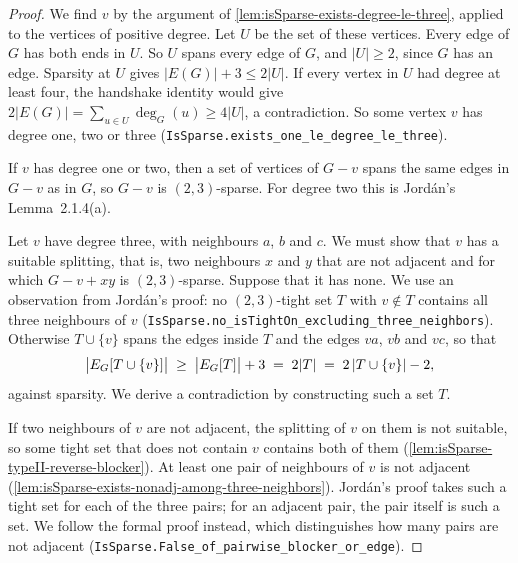 \begin{proof}
  \leanok
  We find $v$ by the argument of
  \cref{lem:isSparse-exists-degree-le-three}, applied to the vertices
  of positive degree. Let $U$ be the set of these vertices. Every edge
  of $G$ has both ends in $U$. So $U$ spans every edge of $G$, and
  $|U| \ge 2$, since $G$ has an edge. Sparsity at $U$ gives
  $|E(G)| + 3 \le 2|U|$. If every vertex in $U$ had degree at least
  four, the handshake identity would give
  $2|E(G)| = \sum_{u \in U} \deg_G(u) \ge 4|U|$, a contradiction. So
  some vertex $v$ has degree one, two or three
  (\texttt{IsSparse.\allowbreak{}exists\_\allowbreak{}one\_\allowbreak{}le\_\allowbreak{}degree\_\allowbreak{}le\_\allowbreak{}three}).

  If $v$ has degree one or two, then a set of vertices of $G - v$
  spans the same edges in $G - v$ as in $G$, so $G - v$ is
  $(2,3)$-sparse. For degree two this is Jord\'an's Lemma~2.1.4(a).

  Let $v$ have degree three, with neighbours $a$, $b$ and $c$. We must
  show that $v$ has a suitable splitting, that is, two neighbours $x$
  and $y$ that are not adjacent and for which $G - v + xy$ is
  $(2,3)$-sparse. Suppose that it has none. We use an observation from
  Jord\'an's proof: no $(2,3)$-tight set $T$ with $v \notin T$ contains
  all three neighbours of $v$
  (\texttt{IsSparse.\allowbreak{}no\_\allowbreak{}isTightOn\_\allowbreak{}excluding\_\allowbreak{}three\_\allowbreak{}neighbors}).
  Otherwise
  $T \cup \{v\}$ spans the edges inside $T$ and the edges $va$, $vb$
  and $vc$, so that
  \[
    \bigl|E_{G}[T \cup \{v\}]\bigr|
    \;\ge\; \bigl|E_{G}[T]\bigr| + 3
    \;=\; 2|T| \;=\; 2\,|T \cup \{v\}| - 2,
  \]
  against sparsity. We derive a contradiction by constructing such a
  set $T$.

  If two neighbours of $v$ are not adjacent, the splitting of $v$ on
  them is not suitable, so some tight set that does not contain $v$
  contains both of them (\cref{lem:isSparse-typeII-reverse-blocker}).
  At least one pair of neighbours of $v$ is not adjacent
  (\cref{lem:isSparse-exists-nonadj-among-three-neighbors}). Jord\'an's
  proof takes such a tight set for each of the three pairs; for an
  adjacent pair, the pair itself is such a set. We follow the formal
  proof instead, which distinguishes how many pairs are not adjacent
  (\texttt{IsSparse.\allowbreak{}False\_\allowbreak{}of\_\allowbreak{}pairwise\_\allowbreak{}blocker\_\allowbreak{}or\_\allowbreak{}edge}).


\end{proof}
